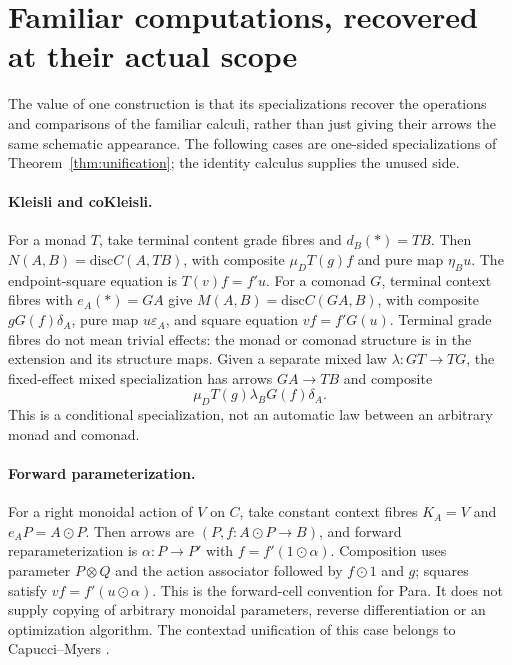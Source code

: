 \documentclass[11pt]{article}
\numberwithin{equation}{section}
\theoremstyle{definition}\newtheorem{definition}[theorem]{Definition}
\newcommand{\Disc}{\mathrm{disc}}\newcommand{\st}{\mathbin{\star}}\newcommand{\di}{\mathbin{\diamond}}\newcommand{\bx}{\mathop{\boxtimes}}
\begin{document}
\section{Familiar computations, recovered at their actual scope}\label{sec:special}
The value of one construction is that its specializations recover the
operations and comparisons of the familiar calculi, rather than just giving
their arrows the same schematic appearance. The following cases are
one-sided specializations of Theorem~\ref{thm:unification}; the identity
calculus supplies the unused side.

\paragraph{Kleisli and coKleisli.}
For a monad $T$, take terminal content grade fibres and $d_B(*)=TB$.
Then $N(A,B)=\Disc C(A,TB)$, with composite $\mu_D T(g)f$ and pure map
$\eta_Bu$. The endpoint-square equation is $T(v)f=f'u$.
For a comonad $G$, terminal context fibres with $e_A(*)=GA$ give
$M(A,B)=\Disc C(GA,B)$, with composite $gG(f)\delta_A$, pure map
$u\varepsilon_A$, and square equation $vf=f'G(u)$.
Terminal grade fibres do not mean trivial effects: the monad or comonad
structure is in the extension and its structure maps.
Given a separate mixed law $\lambda:GT\to TG$, the fixed-effect mixed
specialization has arrows $GA\to TB$ and composite
\[
             \mu_D T(g)\lambda_B G(f)\delta_A.
\]
This is a conditional specialization, not an automatic law between an
arbitrary monad and comonad.

\paragraph{Forward parameterization.}
For a right monoidal action of $V$ on $C$, take constant context fibres
$K_A=V$ and $e_AP=A\mathbin{\odot}P$. Then arrows are
$(P,f:A\odot P\to B)$, and forward reparameterization is
$\alpha:P\to P'$ with $f=f'(1\odot\alpha)$. Composition uses parameter
$P\otimes Q$ and the action associator followed by $f\odot1$ and $g$;
squares satisfy $vf=f'(u\odot\alpha)$. This is the forward-cell convention
for Para. It does not supply copying of arbitrary monoidal parameters,
reverse differentiation or an optimization algorithm. The contextad
unification of this case belongs to Capucci--Myers \cite{CM}.
\end{document}
